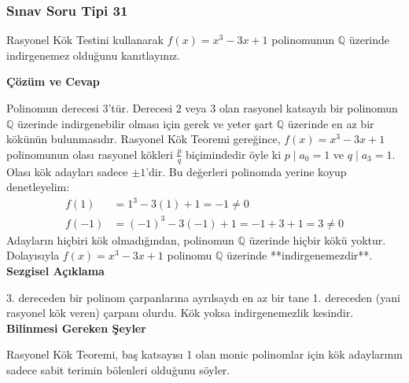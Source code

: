 \documentclass[11pt, a4paper]{article}
\newenvironment{cozum}{
    \vspace{0.5cm}
    \noindent\textcolor{green!60!black}{\faCheckCircle\enspace \textbf{\Large Çözüm ve Cevap}}\par\vspace{0.2cm}
}{}
\newenvironment{sezgisel}{
    \vspace{0.5cm}
    \noindent\textcolor{orange!80!black}{\faLightbulb\enspace \textbf{\Large Sezgisel Açıklama}}\par\vspace{0.2cm}
    \itshape
}{}
\newenvironment{bilgi}{
    \vspace{0.5cm}
    \noindent\textcolor{red!70!black}{\faExclamationTriangle\enspace \textbf{\Large Bilinmesi Gereken Şeyler}}\par\vspace{0.2cm}
}{}
\begin{document}
\subsubsection{Sınav Soru Tipi 31}
\begin{sinavbox}
Rasyonel Kök Testini kullanarak $f(x) = x^3-3x+1$ polinomunun $\mathbb{Q}$ üzerinde indirgenemez olduğunu kanıtlayınız.
\end{sinavbox}
\begin{cozum}
Polinomun derecesi 3'tür. Derecesi 2 veya 3 olan rasyonel katsayılı bir polinomun $\mathbb{Q}$ üzerinde indirgenebilir olması için gerek ve yeter şart $\mathbb{Q}$ üzerinde en az bir kökünün bulunmasıdır. Rasyonel Kök Teoremi gereğince, $f(x) = x^3-3x+1$ polinomunun olası rasyonel kökleri $\frac{p}{q}$ biçimindedir öyle ki $p \mid a_0 = 1$ ve $q \mid a_3 = 1$.
Olası kök adayları sadece $\pm 1$'dir.
Bu değerleri polinomda yerine koyup denetleyelim:
\begin{align*}
f(1) &= 1^3 - 3(1) + 1 = -1 \neq 0 \\
f(-1) &= (-1)^3 - 3(-1) + 1 = -1 + 3 + 1 = 3 \neq 0
\end{align*}
Adayların hiçbiri kök olmadığından, polinomun $\mathbb{Q}$ üzerinde hiçbir kökü yoktur.
Dolayısıyla $f(x) = x^3-3x+1$ polinomu $\mathbb{Q}$ üzerinde **indirgenemezdir**.
\end{cozum}
\begin{sezgisel}
3. dereceden bir polinom çarpanlarına ayrılsaydı en az bir tane 1. dereceden (yani rasyonel kök veren) çarpanı olurdu. Kök yoksa indirgenemezlik kesindir.
\end{sezgisel}
\begin{bilgi}
Rasyonel Kök Teoremi, baş katsayısı 1 olan monic polinomlar için kök adaylarının sadece sabit terimin bölenleri olduğunu söyler.
\end{bilgi}

\newpage
\end{document}
